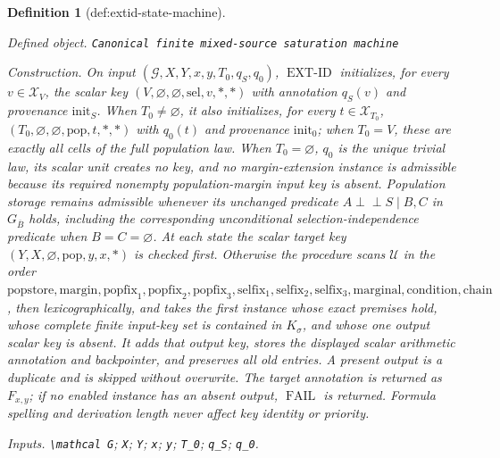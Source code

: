 \documentclass{article}
\newtheorem{definition}{Definition}
\begin{document}
\begin{definition}[def:extid-state-machine]\label{def:extid-state-machine}
\par\smallskip\noindent\emph{Defined object.} \texttt{Canonical finite mixed-\allowbreak{}source saturation machine}
\par\smallskip\noindent\emph{Construction.} On input \((\mathcal G,X,Y,x,y,T_0,q_S,q_0)\), \(\operatorname{EXT\text{-}ID}\) initializes, for every \(v\in\mathcal X_V\), the scalar key \((V,\varnothing,\varnothing,\mathrm{sel},v,\ast,\ast)\) with annotation \(q_S(v)\) and provenance \(\mathrm{init}_S\). When \(T_0\ne\varnothing\), it also initializes, for every \(t\in\mathcal X_{T_0}\), \((T_0,\varnothing,\varnothing,\mathrm{pop},t,\ast,\ast)\) with \(q_0(t)\) and provenance \(\mathrm{init}_0\); when \(T_0=V\), these are exactly all cells of the full population law. When \(T_0=\varnothing\), \(q_0\) is the unique trivial law, its scalar unit creates no key, and no margin-extension instance is admissible because its required nonempty population-margin input key is absent. Population storage remains admissible whenever its unchanged predicate \(A\perp\!\!\!\perp S\mid B,C\) in \(G_{\overline B}\) holds, including the corresponding unconditional selection-independence predicate when \(B=C=\varnothing\). At each state the scalar target key \((Y,X,\varnothing,\mathrm{pop},y,x,\ast)\) is checked first. Otherwise the procedure scans \(\mathscr U\) in the order \(\mathrm{popstore},\mathrm{margin},\mathrm{popfix}_1,\mathrm{popfix}_2,\mathrm{popfix}_3,\mathrm{selfix}_1,\mathrm{selfix}_2,\mathrm{selfix}_3,\mathrm{marginal},\mathrm{condition},\mathrm{chain}\), then lexicographically, and takes the first instance whose exact premises hold, whose complete finite input-key set is contained in \(K_\sigma\), and whose one output scalar key is absent. It adds that output key, stores the displayed scalar arithmetic annotation and backpointer, and preserves all old entries. A present output is a duplicate and is skipped without overwrite. The target annotation is returned as \(F_{x,y}\); if no enabled instance has an absent output, \(\operatorname{FAIL}\) is returned. Formula spelling and derivation length never affect key identity or priority.
\par\smallskip\noindent\emph{Inputs.} \texttt{\textbackslash{}\allowbreak{}mathcal G}; \texttt{X}; \texttt{Y}; \texttt{x}; \texttt{y}; \texttt{T\_\allowbreak{}0}; \texttt{q\_\allowbreak{}S}; \texttt{q\_\allowbreak{}0}.
\end{definition}
\end{document}
